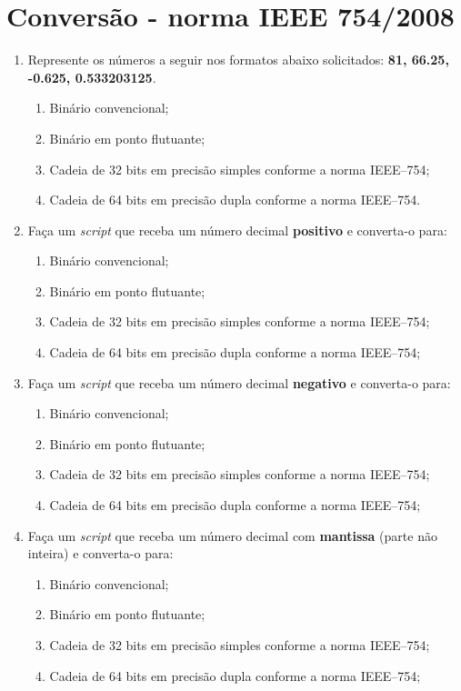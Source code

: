 
\section{Conversão - norma IEEE 754/2008} \label{sec:conversão}

\begin{enumerate}[label=\thesection.\arabic*]
\item Represente os números a seguir nos formatos abaixo solicitados: 
{\bf 81, 66.25, -0.625, 0.533203125}.
    \begin{enumerate}
        \item Binário convencional;
        \item Binário em ponto flutuante;
        \item Cadeia de 32 bits em precisão simples conforme a norma IEEE--754;
        \item Cadeia de 64 bits em precisão dupla conforme a norma IEEE--754.
    \end{enumerate}
    
\item Faça um {\it script} que receba um número decimal {\bf positivo} e converta-o para:
    \begin{enumerate}
        \item Binário convencional;
        \item Binário em ponto flutuante;
        \item Cadeia de 32 bits em precisão simples conforme a norma IEEE--754;
        \item Cadeia de 64 bits em precisão dupla conforme a norma IEEE--754;
    \end{enumerate}
    
\item Faça um {\it script} que receba um número decimal {\bf negativo} e converta-o para:
	\begin{enumerate}
        \item Binário convencional;
        \item Binário em ponto flutuante;
        \item Cadeia de 32 bits em precisão simples conforme a norma IEEE--754;
        \item Cadeia de 64 bits em precisão dupla conforme a norma IEEE--754;
    \end{enumerate}
    
\item Faça um {\it script} que receba um número decimal com {\bf mantissa} (parte não inteira) e converta-o para:
\begin{enumerate}
        \item Binário convencional;
        \item Binário em ponto flutuante;
        \item Cadeia de 32 bits em precisão simples conforme a norma IEEE--754;
        \item Cadeia de 64 bits em precisão dupla conforme a norma IEEE--754;
\end{enumerate}


\end{enumerate}

